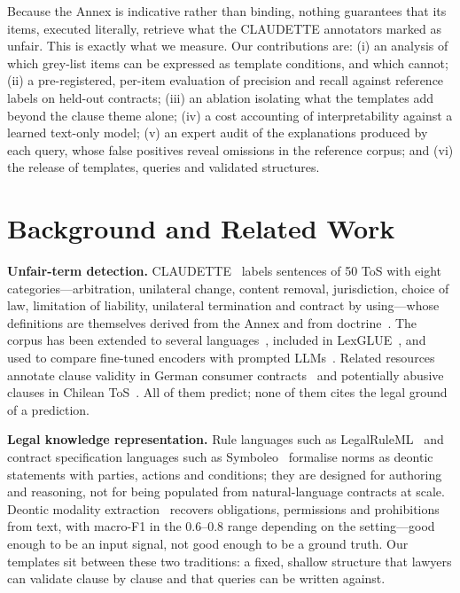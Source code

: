 \documentclass{IOS-Book-Article}
\newcommand{\corpus}{CLAUDETTE}
\begin{document}
Because the Annex is indicative rather than binding, nothing guarantees that its items, executed literally, retrieve what the \corpus{} annotators marked as unfair. This is exactly what we measure. Our contributions are: (i) an analysis of which grey-list items can be expressed as template conditions, and which cannot; (ii) a pre-registered, per-item evaluation of precision and recall against reference labels on held-out contracts; (iii) an ablation isolating what the templates add beyond the clause theme alone; (iv) a cost accounting of interpretability against a learned text-only model; (v) an expert audit of the explanations produced by each query, whose false positives reveal omissions in the reference corpus; and (vi) the release of templates, queries and validated structures.

\section{Background and Related Work}
\label{sec:related}
\textbf{Unfair-term detection.} \corpus{}~\cite{lippi2019claudette,lagioia2019deep} labels sentences of 50 ToS with eight categories---arbitration, unilateral change, content removal, jurisdiction, choice of law, limitation of liability, unilateral termination and contract by using---whose definitions are themselves derived from the Annex and from doctrine~\cite{micklitz2017empire}. The corpus has been extended to several languages~\cite{drawzeski2021corpus,galassi2024multilingual}, included in LexGLUE~\cite{chalkidis2022lexglue}, and used to compare fine-tuned encoders with prompted LLMs~\cite{panarelli2025worth}. Related resources annotate clause validity in German consumer contracts~\cite{braun2024agbde} and potentially abusive clauses in Chilean ToS~\cite{loffler2025chilean}. All of them predict; none of them cites the legal ground of a prediction.

\textbf{Legal knowledge representation.} Rule languages such as LegalRuleML~\cite{athan2015legalruleml} and contract specification languages such as Symboleo~\cite{sharifi2020symboleo} formalise norms as deontic statements with parties, actions and conditions; they are designed for authoring and reasoning, not for being populated from natural-language contracts at scale. Deontic modality extraction~\cite{chalkidis2018obligation,sancheti2022lexdemod} recovers obligations, permissions and prohibitions from text, with macro-F1 in the 0.6--0.8 range depending on the setting---good enough to be an input signal, not good enough to be a ground truth. Our templates sit between these two traditions: a fixed, shallow structure that lawyers can validate clause by clause and that queries can be written against.
\end{document}
